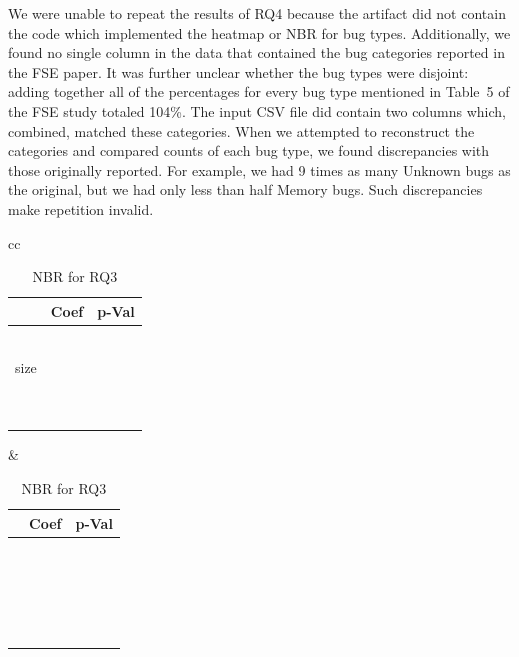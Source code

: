 \documentclass[acmsmall]{acmart}
\begin{document}
We were unable to repeat the results of RQ4 because the artifact did not
contain the code which implemented the heatmap or NBR for bug
types. Additionally, we found no single column in the data that contained
the bug categories reported in the FSE paper. It was further unclear whether
the bug types were disjoint: adding together all of the percentages for
every bug type mentioned in Table~5 of the FSE study totaled 104\%.  The
input CSV file did contain two columns which, combined, matched these
categories. When we attempted to reconstruct the categories and compared
counts of each bug type, we found discrepancies with those originally
reported.  For example, we had 9 times as many Unknown bugs as the original,
but we had only less than half Memory bugs.  Such discrepancies make
repetition invalid.

\begin{table}[!h]\centering \caption{NBR for RQ3}
\begin{tabular}{cc}
\begin{minipage}{4.5cm}\begin{tabular}{@{}r|rl@{}}  \hline
  \rule{0pt}{3ex} & Coef & p-Val \\ \hline \hline
  \rqIIInameI & \rqIIIcoefI & \rqIIIpvI \\ 
  \rqIIInameII & ~\rqIIIcoefII & \rqIIIpvII \\ 
  \rqIIInameIII size & ~\rqIIIcoefIII & \rqIIIpvIII \\ 
  \rqIIInameIV & ~\rqIIIcoefIV & \rqIIIpvIV \\ 
  \rqIIInameV & ~\rqIIIcoefV & \rqIIIpvV \\  \hline \hline
\end{tabular}
\end{minipage}&\begin{minipage}{4.5cm}
\begin{tabular}{@{}r|rl@{}}  \hline
  \rule{0pt}{3ex} & Coef & p-Val \\ \hline \hline
  \rqIIInameVI & ~\rqIIIcoefVI & \rqIIIpvVI \\ 
  \rqIIInameVII & \rqIIIcoefVII & \rqIIIpvVII \\ 
  \rqIIInameVIII & ~\rqIIIcoefVIII & \rqIIIpvVIII \\ 
  \rqIIInameIX & ~\rqIIIcoefIX & \rqIIIpvIX \\ 
  \rqIIInameX & \rqIIIcoefX & \rqIIIpvX \\ 
  \rqIIInameXI & ~\rqIIIcoefXI & \rqIIIpvXI \\    \hline
\end{tabular}\end{minipage}
\end{tabular}
\label{domainNBR}
\end{table}
\end{document}
